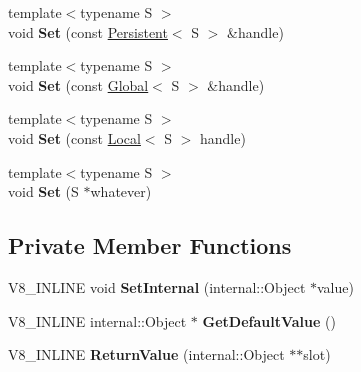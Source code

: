 \begin{DoxyCompactItemize}
\item 
{\footnotesize template$<$typename S $>$ }\\void {\bfseries Set} (const \hyperlink{classv8_1_1_persistent}{Persistent}$<$ S $>$ \&handle)\hypertarget{classv8_1_1_return_value_a2ff02f4be7d7fdcf0e21be43dfd4fe43}{}\label{classv8_1_1_return_value_a2ff02f4be7d7fdcf0e21be43dfd4fe43}

\item 
{\footnotesize template$<$typename S $>$ }\\void {\bfseries Set} (const \hyperlink{classv8_1_1_global}{Global}$<$ S $>$ \&handle)\hypertarget{classv8_1_1_return_value_a57c4b962cf2ca387d3fb9a2f8e47a963}{}\label{classv8_1_1_return_value_a57c4b962cf2ca387d3fb9a2f8e47a963}

\item 
{\footnotesize template$<$typename S $>$ }\\void {\bfseries Set} (const \hyperlink{classv8_1_1_local}{Local}$<$ S $>$ handle)\hypertarget{classv8_1_1_return_value_a69d99ab0e0c12d68291d425287532799}{}\label{classv8_1_1_return_value_a69d99ab0e0c12d68291d425287532799}

\item 
{\footnotesize template$<$typename S $>$ }\\void {\bfseries Set} (S $\ast$whatever)\hypertarget{classv8_1_1_return_value_a766f60aa4d7d86bfb949d3c40b147ef7}{}\label{classv8_1_1_return_value_a766f60aa4d7d86bfb949d3c40b147ef7}

\end{DoxyCompactItemize}
\subsection*{Private Member Functions}
\begin{DoxyCompactItemize}
\item 
V8\+\_\+\+I\+N\+L\+I\+NE void {\bfseries Set\+Internal} (internal\+::\+Object $\ast$value)\hypertarget{classv8_1_1_return_value_a364b24a88d730fc7fd0eab0e7c3cd708}{}\label{classv8_1_1_return_value_a364b24a88d730fc7fd0eab0e7c3cd708}

\item 
V8\+\_\+\+I\+N\+L\+I\+NE internal\+::\+Object $\ast$ {\bfseries Get\+Default\+Value} ()\hypertarget{classv8_1_1_return_value_af30c5efde16a4242b10c9d9a01a8ddff}{}\label{classv8_1_1_return_value_af30c5efde16a4242b10c9d9a01a8ddff}

\item 
V8\+\_\+\+I\+N\+L\+I\+NE {\bfseries Return\+Value} (internal\+::\+Object $\ast$$\ast$slot)\hypertarget{classv8_1_1_return_value_ae696ba3e11a56243aa19f8875e71b72c}{}\label{classv8_1_1_return_value_ae696ba3e11a56243aa19f8875e71b72c}

\end{DoxyCompactItemize}
